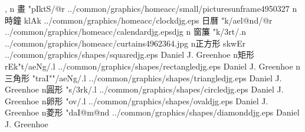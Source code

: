 \begin{tGe}{14}{, }
   {n} {畫}    {}{"pIktS{/@r}}       {../common/graphics/homeacc/small/picturesunframe4950327}{}
     {n} {時鐘}  {}{klAk}              {../common/graphics/homeacc/clockdjg.eps}  {}%
   {日曆}  {}{"k{/ae}l@nd{/@r}}   {../common/graphics/homeacc/calendardjg.eps}{djg}%
   {n} {窗簾}   {}{"k{/3r}t{/.n}}  {../common/graphics/homeacc/curtains4962364.jpg}{}%
         {n}{正方形}    {}{skwEr}                  {../common/graphics/shapes/squaredjg.eps}    {Daniel J. Greenhoe}
      {n}{矩形}      {}{rEk"t{/ae}Ng{/.l}}       {../common/graphics/shapes/rectangledjg.eps} {Daniel J. Greenhoe}
       {n}{三角形}    {}{"traI""{/ae}Ng{/.l}}     {../common/graphics/shapes/triangledjg.eps}  {Daniel J. Greenhoe}
         {n}{圓形}      {}{"s{/3r}k{/.l}}          {../common/graphics/shapes/circledjg.eps}    {Daniel J. Greenhoe}
           {n}{卵形}      {}{"ov{/.l}}               {../common/graphics/shapes/ovaldjg.eps}      {Daniel J. Greenhoe}
        {n}{菱形}      {}{"daI@m@nd}              {../common/graphics/shapes/diamonddjg.eps}   {Daniel J. Greenhoe}

\end{tGe}
